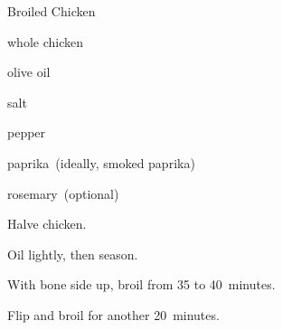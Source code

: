 \begin{recipe}{Broiled Chicken}{}{}

\begin{ingredients}
\item whole chicken
\item olive oil
\item salt
\item pepper
\item paprika~(ideally, smoked paprika)
\item rosemary~(optional)
\end{ingredients}

\begin{directions}
\item Halve chicken.
\item Oil lightly, then season.
\item With bone side up, broil from 35 to 40~minutes.
\item Flip and broil for another 20~minutes.
\end{directions}

\end{recipe}
